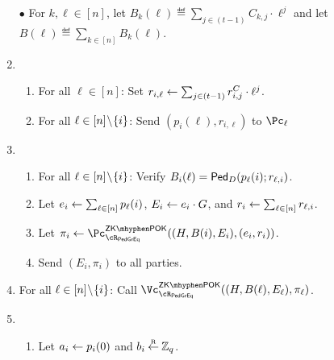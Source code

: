 \begin{protocol}
\begin{enumerate}
			\item[$\bullet$]  For $k,\ell \in [n]$, let $B_k(\ell)  \eqdef   \sum_{j\in (t-1)} C_{k,j} \cdot \ell^j$ and let $B(\ell) 
			\eqdef \sum_{k \in [n]} B_k(\ell) $. 
			
			\item  {}
			
			\begin{enumerate}
				\item For all $\ell \in [n]$: Set $r_{i,\ell} \leftarrow  \sum_{j\in (t-1)} r_{i,j}^C \cdot \ell^j$.   
				
				\item For all $\ell \in [n]\!\setminus\!\{i\}$: Send $(p_i(\ell),r_{i,\ell})$ to $\Pc_\ell$
			\end{enumerate}
			
	
			
			
			\item 	{}
			
			\begin{enumerate}
				\item 	For all $\ell\in [n]\!\setminus\!\{i\}$: Verify   $B_i(\ell) = \mathsf{Ped}_D(p_\ell(i);r_{\ell,i})$.
				
				\item Let $e_i \leftarrow  \sum_{\ell \in [n]} p_\ell(i)$, $E_i \leftarrow e_i \cdot G$, and $r_i 
				\leftarrow  \sum_{\ell \in [n]} r_{\ell,i}$.
				
				
				\item Let $\pi_i \asn \pZKPOK{\rPedGEq}((H,B(i),E_i),(e_i,r_i ))$.
				
				
				\item Send $(E_i,\pi_i)$ to all parties.
			\end{enumerate}
		
				
		\item For all $\ell\in [n]\!\setminus\!\{i\}$: Call $\vZKPOK{\rPedGEq}((H,B(\ell),E_\ell),\pi_\ell)$.
		
		
		
		\item 	{}
		
		\begin{enumerate}
			
			
			\item Let $a_i \leftarrow p_i(0)$ and $b_i \mathbin{\stackrel{\mbox{\tiny R}}{\leftarrow}} {\mathbb Z}_q$.
			

\end{enumerate}
\end{enumerate}
\end{protocol}
